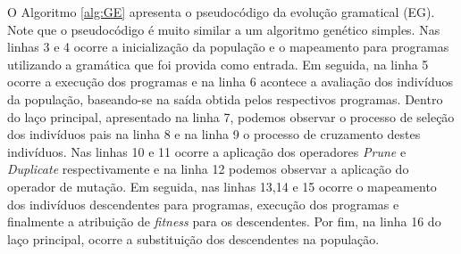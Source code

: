 O Algoritmo \ref{alg:GE} apresenta o pseudocódigo da evolução gramatical (EG). Note que o pseudocódigo é muito similar a um algoritmo genético simples. Nas linhas 3 e 4 ocorre a inicialização da população e o mapeamento para programas utilizando a gramática que foi provida como entrada. Em seguida, na linha 5 ocorre a execução dos programas e na linha 6 acontece a avaliação dos indivíduos da população, baseando-se na saída obtida pelos respectivos programas. Dentro do laço principal, apresentado na linha 7, podemos observar o processo de seleção dos indivíduos pais na linha 8 e na linha 9 o processo de cruzamento destes indivíduos. Nas linhas 10 e 11 ocorre a aplicação dos operadores \textit{Prune} e \textit{Duplicate} respectivamente e na linha 12 podemos observar a aplicação do operador de mutação. Em seguida, nas linhas 13,14 e 15 ocorre o mapeamento dos indivíduos descendentes para programas, execução dos programas e finalmente a atribuição de \textit{fitness} para os descendentes. Por fim, na linha 16 do laço principal, ocorre a substituição dos descendentes na população. 





